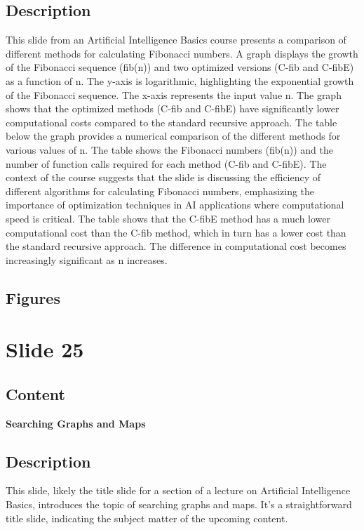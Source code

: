 \documentclass{article}%
\begin{document}
\subsection{Description}%
This slide from an Artificial Intelligence Basics course presents a comparison of different methods for calculating Fibonacci numbers.  A graph displays the growth of the Fibonacci sequence (fib(n)) and two optimized versions (C-fib and C-fibE) as a function of n. The y-axis is logarithmic, highlighting the exponential growth of the Fibonacci sequence. The x-axis represents the input value n. The graph shows that the optimized methods (C-fib and C-fibE) have significantly lower computational costs compared to the standard recursive approach.  The table below the graph provides a numerical comparison of the different methods for various values of n.  The table shows the Fibonacci numbers (fib(n)) and the number of function calls required for each method (C-fib and C-fibE).  The context of the course suggests that the slide is discussing the efficiency of different algorithms for calculating Fibonacci numbers, emphasizing the importance of optimization techniques in AI applications where computational speed is critical. The table shows that the C-fibE method has a much lower computational cost than the C-fib method, which in turn has a lower cost than the standard recursive approach.  The difference in computational cost becomes increasingly significant as n increases.%
\subsection{Figures}%
\begin{figure}[H]%
\centering%
\end{figure}

%
\newpage%
\section{Slide 25}%
\label{sec:Slide25}%
\subsection{Content}%

\textbf{Searching Graphs and Maps}
%
\subsection{Description}%
This slide, likely the title slide for a section of a lecture on Artificial Intelligence Basics, introduces the topic of searching graphs and maps.  It's a straightforward title slide, indicating the subject matter of the upcoming content.%
\end{document}
